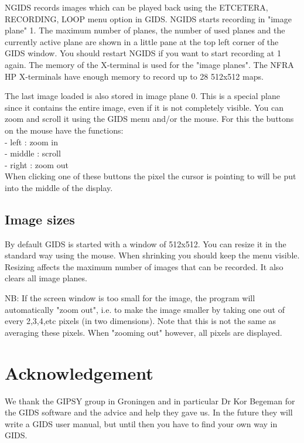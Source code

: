 	NGIDS records images which can be played back using the ETCETERA,
RECORDING, LOOP menu option in GIDS. NGIDS starts recording in "image plane" 1.
The maximum number of planes, the number of used planes and the currently
active plane are shown in a little pane at the top left corner of the GIDS
window. You should restart NGIDS if you want to start recording at 1 again. The
memory of the X-terminal is used for the "image planes". The NFRA HP
X-terminals have enough memory to record up to 28 512x512 maps.

	The last image loaded is also stored in image plane 0. This is a
special plane since it contains the entire image, even if it is not completely
visible. You can zoom and scroll it using the GIDS menu and/or the mouse. For
this the buttons on the mouse have the functions: \\ -    left   : zoom in \\ -
   middle : scroll \\ -    right  : zoom out \\ When clicking one of these
buttons the pixel the cursor is pointing to will be put into the middle of the
display.


\subsection{ Image sizes}

	By default GIDS is started with a window of 512x512. You can resize it
in the standard way using the mouse. When shrinking you should keep the menu
visible. Resizing affects the maximum number of images that can be recorded. It
also clears all image planes.

	NB: If the screen window is too small for the image, the program will
automatically "zoom out", i.e. to make the image smaller by taking one out of
every 2,3,4,etc pixels (in two dimensions). Note that this is not the same as
averaging these pixels. When "zooming out" however, all pixels are displayed.


\section{ Acknowledgement}

	We thank the GIPSY group in Groningen and in particular Dr Kor Begeman
for the GIDS software and the advice and help they gave us. In the future they
will write a GIDS user manual, but until then you have to find your own way in
GIDS.
